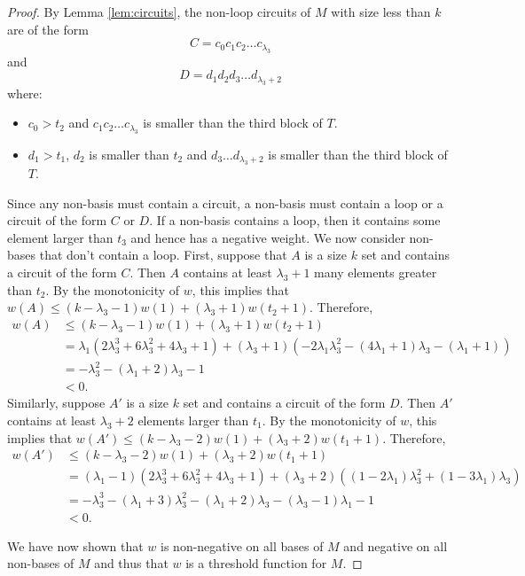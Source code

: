 \documentclass{amsart}
\theoremstyle{definition}
\theoremstyle{plain}
\begin{document}
\begin{proof}
\noindent By Lemma \ref{lem:circuits}, the non-loop circuits of $M$ with size less than $k$ are of the form 
\[C = c_0  c_{1}  c_{2} \ldots  c_{\lambda_3}\]
and 
\[D = d_1  d_{2}  d_{3} \ldots  d_{\lambda_3+2}\]
where: 
\begin{itemize}
\item $c_0>t_2$ and $c_{1} c_{2} \ldots c_{\lambda_3}$ is smaller than the third block of $T$.
\item $d_1>t_1$,  $d_{2}$ is smaller than $t_2$ and  $d_{3} \ldots d_{\lambda_3+2}$ is smaller than the third block of $T$.
\end{itemize}
Since any non-basis must contain a circuit, a non-basis must contain a loop or a circuit of the form $C$ or $D$. If a non-basis contains a loop, then it contains some element larger than $t_3$ and hence has a negative weight. We now consider non-bases that don't contain a loop. First, suppose that $A$ is a size $k$ set and contains a circuit of the form $C$. Then $A$ contains at least $\lambda_3+1$ many elements greater than $t_2$. By the monotonicity of $w$, this implies that $w(A) \leq (k-\lambda_3-1)w(1) + (\lambda_3+1)w(t_2+1)$. Therefore, 
\begin{align*}
w(A) &\leq (k-\lambda_3-1)w(1) + (\lambda_3+1)w(t_2+1)\\
     &= \lambda_1\left(2\lambda_3^3+6\lambda_3^2+4\lambda_3+1\right) + (\lambda_3+1)\left(-2\lambda_1\lambda_3^2-(4\lambda_1+1)\lambda_3-(\lambda_1+1)\right)\\
     &= -\lambda_3^2-(\lambda_1+2)\lambda_3-1\\
     &< 0.
\end{align*}
Similarly, suppose $A'$ is a size $k$ set and contains a circuit of the form $D$. Then $A'$ contains at least $\lambda_3+2$ elements larger than $t_1$. By the monotonicity of $w$, this implies that $w(A') \leq (k-\lambda_3-2)w(1) + (\lambda_3+2)w(t_1+1)$. Therefore, 
\begin{align*}
w(A') &\leq (k-\lambda_3-2)w(1) + (\lambda_3+2)w(t_1+1)\\
      &= (\lambda_1-1)\left(2\lambda_3^3+6\lambda_3^2+4\lambda_3+1\right) + (\lambda_3+2)\left((1-2\lambda_1)\lambda_3^2+(1-3\lambda_1)\lambda_3\right)\\
      &= -\lambda_3^3-(\lambda_1+3)\lambda_3^2-(\lambda_1+2)\lambda_3-(\lambda_3-1)\lambda_1-1\\
      &< 0.
\end{align*}

We have now shown that $w$ is non-negative on all bases of $M$ and negative on all non-bases of $M$ and thus that $w$ is a threshold function for $M$. 
\end{proof}
\end{document}
